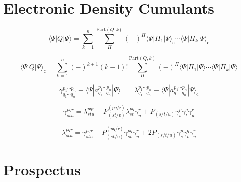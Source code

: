 \section{Electronic Density Cumulants}

\begin{equation}
    \langle\Psi|Q|\Psi\rangle
    =
    \sum_{k=1}^n
    \sum_{\Pi}^{\mathrm{Part}(Q, k)}
    (-)^{\Pi}
    \langle\Psi|\Pi_1|\Psi\rangle_\mathrm{c}
    \cdots
    \langle\Psi|\Pi_k|\Psi\rangle_\mathrm{c}
\end{equation}

\begin{equation}
    \langle\Psi|Q|\Psi\rangle_\mathrm{c}
    =
    \sum_{k=1}^n
    (-)^{k+1}
    (k-1)!
    \sum_{\Pi}^{\mathrm{Part}(Q, k)}
    (-)^{\Pi}
    \langle\Psi|\Pi_1|\Psi\rangle
    \cdots
    \langle\Psi|\Pi_k|\Psi\rangle
\end{equation}

\begin{equation}
    \gamma^{p_1\cdots p_n}_{q_1\cdots q_n}
    \equiv
    \langle\Psi|a^{p_1\cdots p_n}_{q_1\cdots q_n}|\Psi\rangle
    \qquad
    \lambda^{p_1\cdots p_n}_{q_1\cdots q_n}
    \equiv
    \langle\Psi|a^{p_1\cdots p_n}_{q_1\cdots q_n}|\Psi\rangle_\mathrm{c}
\end{equation}

\begin{equation}
    \gamma^{pqr}_{stu}
    =
    \lambda^{pqr}_{stu}
    +
    P^{(pq/r)}_{(st/u)}
    \lambda^{pq}_{st}
    \gamma^r_u
    +
    P_{(s/t/u)}
    \gamma^p_s
    \gamma^q_t
    \gamma^r_u
\end{equation}

\begin{equation}
    \lambda^{pqr}_{stu}
    =
    \gamma^{pqr}_{stu}
    -
    P^{(pq/r)}_{(st/u)}
    \gamma^{pq}_{st}
    \gamma^r_u
    +
    2
    P_{(s/t/u)}
    \gamma^p_s
    \gamma^q_t
    \gamma^r_u
\end{equation}


\section{Prospectus}


